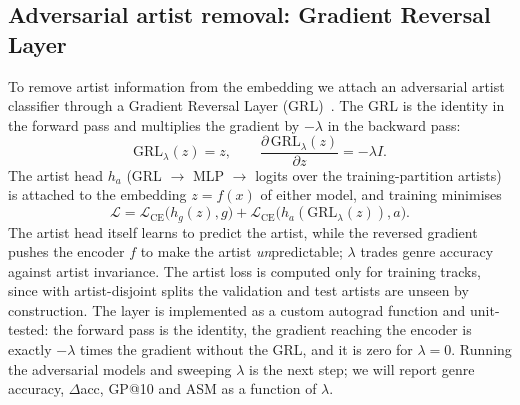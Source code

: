 \subsection{Adversarial artist removal: Gradient Reversal Layer}
\label{sec:grl}

To remove artist information from the embedding we attach an adversarial artist
classifier through a Gradient Reversal Layer (GRL)~\cite{ganin2015unsupervised}.
The GRL is the identity in the forward pass and multiplies the gradient by
\(-\lambda\) in the backward pass:
\begin{equation}
  \text{GRL}_\lambda(z) = z, \qquad
  \frac{\partial\,\text{GRL}_\lambda(z)}{\partial z} = -\lambda I.
  \label{eq:grl}
\end{equation}
The artist head \(h_a\) (GRL \(\rightarrow\) MLP \(\rightarrow\) logits over
the training-partition artists) is attached to the embedding \(z = f(x)\) of
either model, and training minimises
\begin{equation}
  \mathcal{L} = \mathcal{L}_\text{CE}\bigl(h_g(z), g\bigr)
              + \mathcal{L}_\text{CE}\bigl(h_a(\text{GRL}_\lambda(z)), a\bigr).
  \label{eq:adv-loss}
\end{equation}
The artist head itself learns to predict the artist, while the reversed
gradient pushes the encoder \(f\) to make the artist \emph{un}predictable; \(\lambda\)
trades genre accuracy against artist invariance. The artist loss is computed
only for training tracks, since with artist-disjoint splits the validation and
test artists are unseen by construction. The layer is implemented as a custom
autograd function and unit-tested: the forward pass is the identity, the
gradient reaching the encoder is exactly \(-\lambda\) times the gradient without
the GRL, and it is zero for \(\lambda=0\). Running the adversarial models and
sweeping \(\lambda\) is the next step; we will report genre accuracy,
\(\Delta\)acc, GP@10 and ASM as a function of \(\lambda\).

